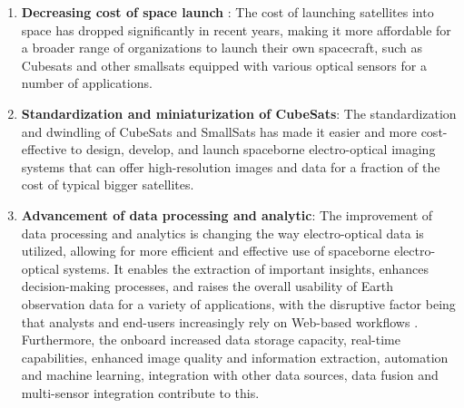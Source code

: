 \documentclass[final,5p,times,sort&compress,twocolumn]{elsarticle}
\begin{document}
\begin{enumerate}
	\item \textbf{Decreasing cost of space launch }: The cost of launching satellites into space has dropped significantly in recent years, making it more affordable for a broader range of organizations to launch their own spacecraft, such as Cubesats and other smallsats equipped with various optical sensors for a number of applications.
	\item \textbf{Standardization and miniaturization of CubeSats}: The standardization and dwindling of CubeSats and SmallSats has made it easier and more cost-effective to design, develop, and launch spaceborne electro-optical imaging systems that can offer high-resolution images and data for a fraction of the cost of typical bigger satellites.
	\item \textbf{Advancement of data processing and analytic}: The improvement of data processing and analytics is changing the way electro-optical data is utilized, allowing for more efficient and effective use of spaceborne electro-optical systems. It enables the extraction of important insights, enhances decision-making processes, and raises the overall usability of Earth observation data for a variety of applications, with the disruptive factor being that analysts and end-users increasingly rely on Web-based workflows \cite{sudmanns2020big}.  Furthermore, the onboard increased data storage capacity, real-time capabilities, enhanced image quality and information extraction, automation and machine learning, integration with other data sources, data fusion and multi-sensor integration contribute to this.
\end{enumerate}
\end{document}
